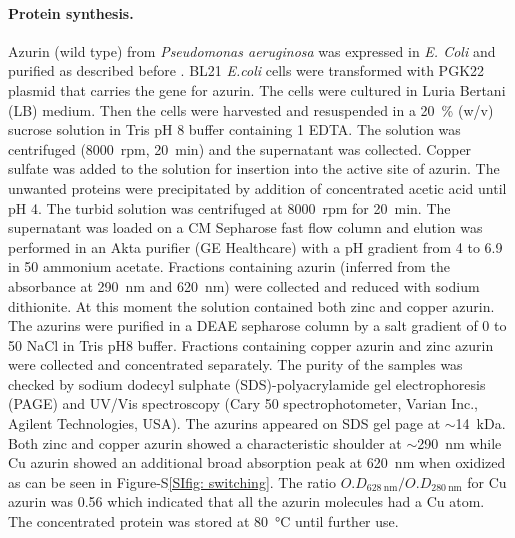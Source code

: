 \documentclass[journal=jacsat,manuscript=article]{achemso}
\begin{document}
\paragraph*{Protein synthesis.}
Azurin (wild type) from \textit{Pseudomonas aeruginosa} was expressed in \textit{E. Coli} and purified as described before \citep{kamp1990purification}.
BL21 \textit{E.coli} cells were transformed with PGK22 plasmid that carries the gene for azurin.
The cells were cultured in Luria Bertani (LB) medium.
Then the cells were harvested and resuspended in a \SI{20}{\percent} (w/v) sucrose solution in Tris pH 8 buffer containing \SI{1}{\mM} EDTA.
The solution was centrifuged (\SI{8000}{ rpm}, \SI{20}{\minute}) and the supernatant was collected.
Copper sulfate was added to the solution for insertion into the active site of azurin.
The unwanted proteins were precipitated by addition of concentrated acetic acid until pH 4. 
The turbid solution was centrifuged at \SI{8000}{ rpm} for \SI{20}{\minute}.
The supernatant was loaded on a CM Sepharose fast flow column and elution was performed in an Akta purifier (GE Healthcare) with a pH gradient from 4 to 6.9 in 
\SI{50}{\mM} ammonium acetate.
Fractions containing azurin (inferred from the absorbance at \SI{290}{\nm} and \SI{620}{\nm}) were collected and reduced with sodium dithionite.
At this moment the solution contained both zinc and copper azurin.
The azurins were purified in a DEAE sepharose column by a salt gradient of 0 to \SI{50}{\mM} NaCl in Tris pH8 buffer. 
Fractions containing copper azurin and zinc azurin were collected and concentrated separately.
The purity of the samples was checked by sodium dodecyl sulphate (SDS)-polyacrylamide gel electrophoresis (PAGE) and UV/Vis spectroscopy (Cary 50 spectrophotometer, Varian Inc., Agilent Technologies, USA).
The azurins appeared on SDS gel page at $\sim$\SI{14}{ kDa}.
Both zinc and copper azurin showed a characteristic shoulder at ${\sim}$\SI{290}{\nm} while Cu azurin showed an additional 
broad absorption peak at \SI{620}{\nm} when oxidized as can be seen in Figure-S\ref{SIfig: switching}. 
The ratio $O.D_{\SI{628}{\nm}}/O.D_{\SI{280}{\nm}}$ for Cu azurin was 0.56 which indicated that all the azurin molecules had a Cu atom. 
The concentrated protein was stored at \SI{80}{\celsius} until further use.
\end{document}
